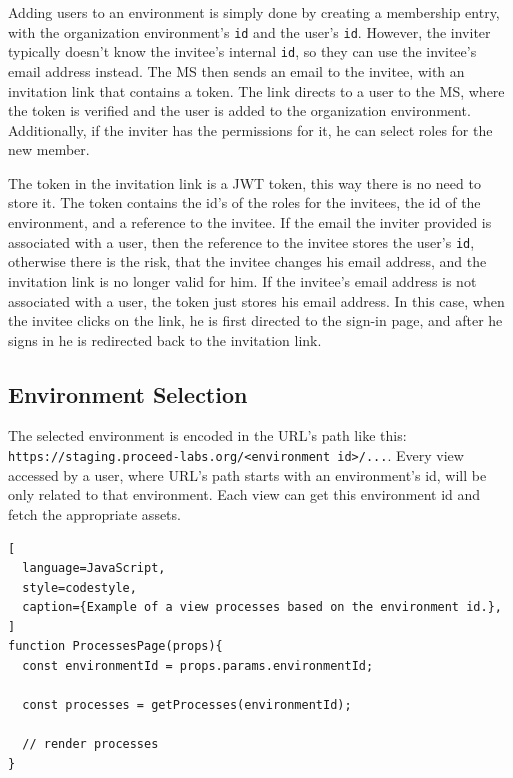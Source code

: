 Adding users to an environment is simply done by creating a membership entry, with the
organization environment's \lstinline{id} and the user's \lstinline{id}.
However, the inviter typically doesn't know the invitee's internal \lstinline{id},
so they can use the invitee's email address instead.
The MS then sends an email to the invitee, with an invitation link that contains a token.
The link directs to a user to the MS, where the token is verified and the user is added to
the organization environment.
Additionally, if the inviter has the permissions for it, he can select roles for the new member.

The token in the invitation link is a JWT token, this way there is no need to store it.
The token contains the id's of the roles for
the invitees, the id of the environment, and a reference to the invitee.
If the email the inviter provided is associated with a user, then the reference to the
invitee stores the user's \lstinline{id}, otherwise there is the risk, that the invitee
changes his email address, and the invitation link is no longer valid for him.
If the invitee's email address is not associated with a user, the token just stores his
email address.
In this case, when the invitee clicks on the link, he is first directed to the sign-in
page, and after he signs in he is redirected back to the invitation link.


\subsection{Environment Selection}


The selected environment is encoded in the URL's path like this:
\lstinline{https://staging.proceed-labs.org/<environment id>/...}.
Every view accessed by a user, where URL's path starts with an environment's id, will be
only related to that environment.
Each view can get this environment id and fetch the appropriate assets.

\begin{lstlisting}[
  language=JavaScript,
  style=codestyle,
  caption={Example of a view processes based on the environment id.},
]
function ProcessesPage(props){
  const environmentId = props.params.environmentId; 

  const processes = getProcesses(environmentId);

  // render processes
}
\end{lstlisting}

